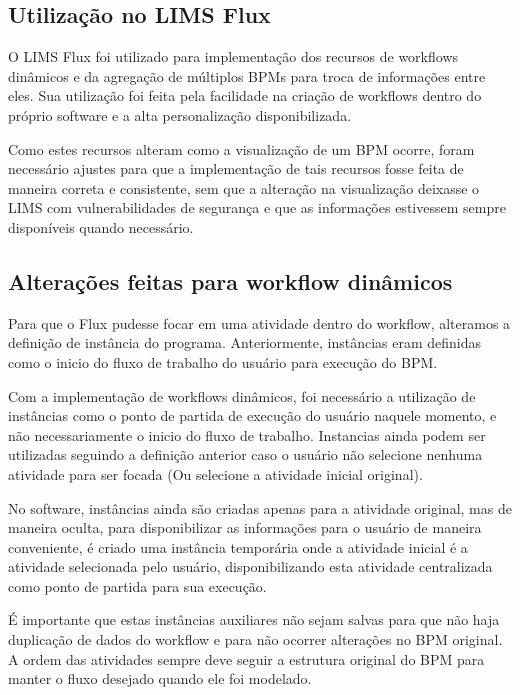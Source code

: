 \subsection{Utilização no LIMS Flux}

O LIMS Flux foi utilizado para implementação dos recursos de workflows dinâmicos e da agregação de múltiplos BPMs para troca de informações entre eles. Sua utilização foi feita pela facilidade na criação de workflows dentro do próprio software e a alta personalização disponibilizada.

Como estes recursos alteram como a visualização de um BPM ocorre, foram necessário ajustes para que a implementação de tais recursos fosse feita de maneira correta e consistente, sem que a alteração na visualização deixasse o LIMS com vulnerabilidades de segurança e que as informações estivessem sempre disponíveis quando necessário.

\subsection{Alterações feitas para workflow dinâmicos}

Para que o Flux pudesse focar em uma atividade dentro do workflow, alteramos a definição de instância do programa. Anteriormente, instâncias eram definidas como o inicio do fluxo de trabalho do usuário para execução do BPM.

Com a implementação de workflows dinâmicos, foi necessário a utilização de instâncias como o ponto de partida de execução do usuário naquele momento, e não necessariamente o inicio do fluxo de trabalho. Instancias ainda podem ser utilizadas seguindo a definição anterior caso o usuário não selecione nenhuma atividade para ser focada (Ou selecione a atividade inicial original).

No software, instâncias ainda são criadas apenas para a atividade original, mas de maneira oculta, para disponibilizar as informações para o usuário de maneira conveniente, é criado uma instância temporária onde a atividade inicial é a atividade selecionada pelo usuário, disponibilizando esta atividade centralizada como ponto de partida para sua execução.

É importante que estas instâncias auxiliares não sejam salvas para que não haja duplicação de dados do workflow e para não ocorrer alterações no BPM original. A ordem das atividades sempre deve seguir a estrutura original do BPM para manter o fluxo desejado quando ele foi modelado.

